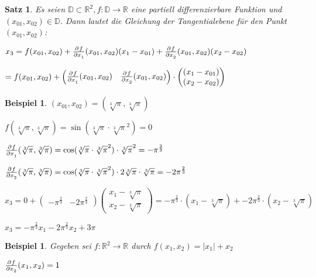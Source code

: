 \documentclass[fontset=ubuntu,11pt,a4paper,fleqn,headsepline]{scrreprt}
\newtheorem{beispiel}[defi]{Beispiel}
\newtheorem{satz}[defi]{Satz}
\begin{document}
\begin{multicols}{2}
    \begin{satz}
    Es seien \(\mathbb{D} \subset \mathbb{R}^2, f:\mathbb{D}\to\mathbb{R}\) eine partiell differenzierbare Funktion und \((x_{01},x_{02})\in\mathbb{D}\). Dann lautet die Gleichung der Tangentialebene für den Punkt \((x_{01},x_{02})\):
    
    \(x_3=f(x_{01},x_{02})+\pd{f}{x_1}(x_{01},x_{02})(x_1-x_{01})+\pd{f}{x_2}(x_{01},x_{02})(x_2-x_{02})\)

    \(=f(x_{01},x_{02})+\begin{pmatrix} \pd{f}{x_1} (x_{01},x_{02}) & \pd{f}{x_2}(x_{01},x_{02}) \end{pmatrix}\cdot \begin{pmatrix} (x_1-x_{01})\\ (x_2-x_{02}) \end{pmatrix}\)
    \end{satz}
    
    \begin{beispiel}
        \((x_{01},x_{02}) = (\sqrt[3]{\pi},\sqrt[3]{\pi})\)
        
        \(f(\sqrt[3]{\pi},\sqrt[3]{\pi})=\sin(\sqrt[3]{\pi}\cdot \sqrt[3]{\pi}^2) = 0\)
        
        \(\pd{f}{x_1}(\sqrt[3]{\pi},\sqrt[3]{\pi})=\cos(\sqrt[3]{\pi}\cdot \sqrt[3]{\pi}^2)\cdot \sqrt[3]{\pi}^2 = -\pi^{\frac{2}{3}}\)
        
        \(\pd{f}{x_2}(\sqrt[3]{\pi},\sqrt[3]{\pi})=\cos(\sqrt[3]{\pi}\cdot \sqrt[3]{\pi}^2)\cdot 2\sqrt[3]{\pi} \cdot \sqrt[3]{\pi} = -2\pi^{\frac{2}{3}}\)
        
        \(x_3 = 0 + \begin{pmatrix}-\pi^{\frac{2}{3}} & -2\pi^{\frac{2}{3}}\end{pmatrix} \begin{pmatrix}x_1 - \sqrt[3]{\pi} \\ x_2 - \sqrt[3]{\pi}\end{pmatrix} = -\pi^{\frac{2}{3}} \cdot (x_1 - \sqrt[3]{\pi}) + -2\pi^{\frac{2}{3}} \cdot (x_2 - \sqrt[3]{\pi})\)
        
        \(x_3 = -\pi^{\frac{2}{3}}x_1 - 2\pi^{\frac{2}{3}}x_2 + 3\pi\)
    \end{beispiel}
    
    \begin{beispiel}
        Gegeben sei \(f:\mathbb{R}^2\to\mathbb{R}\) durch \(f(x_1,x_2)=\left| x_1 \right| + x_2\)

        \(\pd{f}{x_2}(x_1,x_2)=1\)
        

\end{beispiel}
\end{multicols}
\end{document}
